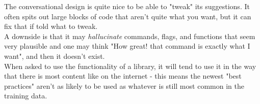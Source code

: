 The conversational design is quite nice to be able to "tweak" its suggestions. It often spits out large blocks of code that aren't quite what you want, but it can fix that if told what to tweak. \\
A downside is that it may \textit{hallucinate} commands, flags, and functions that seem very plausible and one may think "How great! that command is exactly what I want", and then it doesn't exist. \\
When asked to use the functionality of a library, it will tend to use it in the way that there is most content like on the internet - this means the newest "best practices" aren't as likely to be used as whatever is still most common in the training data.  